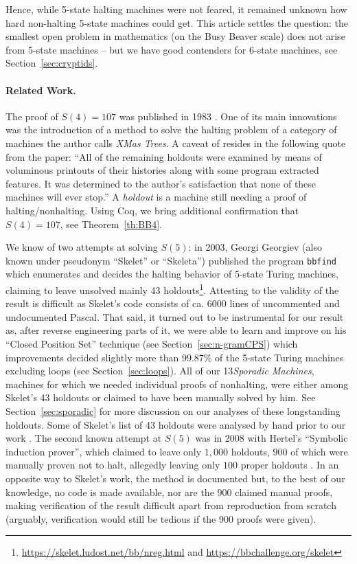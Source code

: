 \documentclass[a4paper,british]{article}
\theoremstyle{definition} %
\numberwithin{equation}{section}
\theoremstyle{definition} %
\newcommand{\ts}[1]{{\color{red}#1}}
\newcommand{\BBtheFourth}{107}
\newcommand{\numSporadic}{13\xspace}
\begin{document}
Hence, while 5-state halting machines were not feared, it remained unknown how hard non-halting 5-state machines could get. This article settles the question: the smallest open problem in mathematics (on the Busy Beaver scale) does not arise from 5-state machines -- but we have good contenders for 6-state machines, see Section~\ref{sec:cryptids}.

\paragraph{Related Work.} The proof of $S(4) = \BBtheFourth$ was published in 1983 \cite{Brady83}. One of its main innovations was the introduction of a method to solve the halting problem of a category of machines the author calls \textit{XMas Trees}. A caveat of \cite{Brady83} resides in the following quote from the paper: ``All of the remaining holdouts were examined by means of voluminous printouts of their histories along with some program extracted features. It was determined to the author's satisfaction that none of these machines will ever stop.'' A \textit{holdout} is a machine still needing a proof of halting/nonhalting. Using Coq, we bring additional confirmation that $S(4) = \BBtheFourth$, see Theorem~\ref{th:BB4}.

\newcommand{\SkeletHoldoutsSporadic}{\ts{XX}\xspace}

We know of two attempts at solving $S(5)$: in 2003, Georgi Georgiev (also known under pseudonym ``Skelet'' or ``Skeleta'') published the program \texttt{bbfind} \cite{Skelet_bbfind} which enumerates and decides the halting behavior of 5-state Turing machines, claiming to leave unsolved mainly 43 holdouts\footnote{\url{https://skelet.ludost.net/bb/nreg.html} and \url{https://bbchallenge.org/skelet}}. Attesting to the validity of the result is difficult as Skelet's code consists of ca. 6000 lines of uncommented and undocumented Pascal. That said, it turned out to be instrumental for our result as, after reverse engineering parts of it, we were able to learn and improve on his ``Closed Position Set'' technique (see Section~\ref{sec:n-gramCPS}) which improvements decided slightly more than 99.87\% of the 5-state Turing machines excluding loops (see Section~\ref{sec:loops}). All of our \numSporadic \textit{Sporadic Machines}, \ie machines for which we needed individual proofs of nonhalting, were either among Skelet's 43 holdouts or claimed to have been manually solved by him. See Section~\ref{sec:sporadic} for more discussion on our analyses of these longstanding holdouts. Some of Skelet's list of 43 holdouts were analysed by hand prior to our work \cite{DanBriggs}. The second known attempt at $S(5)$ was in 2008 with Hertel's ``Symbolic induction prover'', which claimed to leave only $1{,}000$ holdouts, $900$ of which were manually proven not to halt, allegedly leaving only $100$ proper holdouts \cite{Hertel}. In an opposite way to Skelet's work, the method is documented but, to the best of our knowledge, no code is made available, nor are the 900 claimed manual proofs, making verification of the result difficult apart from reproduction from scratch (arguably, verification would still be tedious if the 900 proofs were given).
\end{document}
